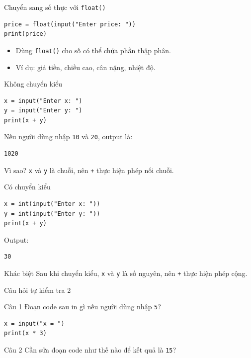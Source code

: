 \documentclass[aspectratio=169,10pt]{beamer}
\begin{document}
\begin{frame}[fragile]{Chuyển sang số thực với \texttt{float()}}
\begin{lstlisting}
price = float(input("Enter price: "))
print(price)
\end{lstlisting}
\begin{itemize}
  \item Dùng \texttt{float()} cho số có thể chứa phần thập phân.
  \item Ví dụ: giá tiền, chiều cao, cân nặng, nhiệt độ.
\end{itemize}
\end{frame}

\begin{frame}[fragile]{Không chuyển kiểu}
\begin{lstlisting}
x = input("Enter x: ")
y = input("Enter y: ")
print(x + y)
\end{lstlisting}
Nếu người dùng nhập \texttt{10} và \texttt{20}, output là:
\begin{verbatim}
1020
\end{verbatim}
\begin{alertblock}{Vì sao?}
\texttt{x} và \texttt{y} là chuỗi, nên \texttt{+} thực hiện phép nối chuỗi.
\end{alertblock}
\end{frame}

\begin{frame}[fragile]{Có chuyển kiểu}
\begin{lstlisting}
x = int(input("Enter x: "))
y = int(input("Enter y: "))
print(x + y)
\end{lstlisting}
Output:
\begin{verbatim}
30
\end{verbatim}
\begin{alertblock}{Khác biệt}
Sau khi chuyển kiểu, \texttt{x} và \texttt{y} là số nguyên, nên \texttt{+} thực hiện phép cộng.
\end{alertblock}
\end{frame}

\begin{frame}[fragile]{Câu hỏi tự kiểm tra 2}
\begin{block}{Câu 1}
Đoạn code sau in gì nếu người dùng nhập \texttt{5}?
\begin{lstlisting}
x = input("x = ")
print(x * 3)
\end{lstlisting}
\end{block}
\begin{block}{Câu 2}
Cần sửa đoạn code như thế nào để kết quả là \texttt{15}?
\end{block}
\end{frame}
\end{document}
